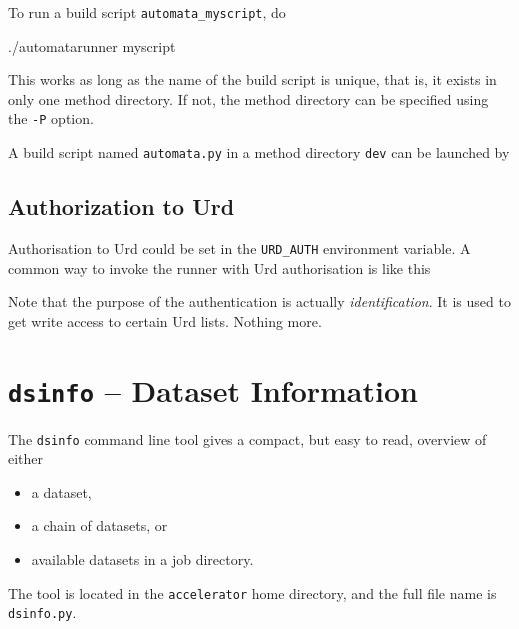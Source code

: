 To run a build script \texttt{automata\_myscript}, do
\begin{python}
./automatarunner myscript
\end{python}
This works as long as the name of the build script is unique, that is,
it exists in only one method directory.  If not, the method directory
can be specified using the \texttt{-P} option.

A build script named \texttt{automata.py} in a method
directory \texttt{dev} can be launched by
\begin{shell}
\end{shell}



\subsection{Authorization to Urd}
Authorisation to Urd could be set in the \texttt{URD\_AUTH}
environment variable.  A common way to invoke the runner with Urd
authorisation is like this
\begin{shell}
\end{shell}
Note that the purpose of the authentication is
actually \textsl{identification}.  It is used to get write access to
certain Urd lists.  Nothing more.









\section{\texttt{dsinfo} -- Dataset Information}
The \texttt{dsinfo} command line tool gives a compact, but easy to
read, overview of either
\begin{itemize}
\item[] a dataset,
\item[] a chain of datasets, or
\item[] available datasets in a job directory.
\end{itemize}
The tool is located in the \texttt{accelerator} home directory, and
the full file name is \texttt{dsinfo.py}.

